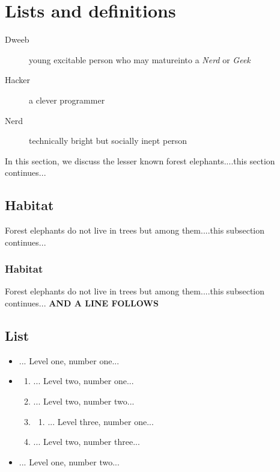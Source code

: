\documentclass{article}
\begin{document}
 \section*{Lists and definitions} \begin{description}
\item[Dweeb] \hspace{1pt} 
young excitable person who may matureinto a \emph{Nerd}
or \emph{Geek}
\item[Hacker] \hspace{1pt} 
a clever programmer\item[Nerd] \hspace{1pt} 
technically bright but socially inept person\end{description}
\par In this section, we discuss the lesser known forest elephants....this section continues...
 \subsection*{Habitat} \par Forest elephants do not live in trees but among them....this subsection continues... 
 \subsubsection*{Habitat} \par Forest elephants do not live in trees but among them....this subsection continues... \textbf{AND A LINE FOLLOWS}

 \subsection*{List} \begin{itemize}
\item \hspace{1pt}... Level one, number one...
\item \hspace{1pt}\begin{enumerate}
\item \hspace{1pt}... Level two, number one...
\item \hspace{1pt}... Level two, number two...
\item \hspace{1pt}\begin{enumerate}
\item \hspace{1pt}... Level three, number one...
\end{enumerate}

\item \hspace{1pt}... Level two, number three...
\end{enumerate}

\item \hspace{1pt}... Level one, number two...
\end{itemize}
\end{document}
